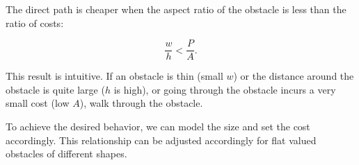 The direct path is cheaper when the aspect ratio of the obstacle  is less than the ratio of costs:

\begin{equation}
\frac{w}{h} < \frac{P}{A}.
\end{equation}

This result is intuitive. If an obstacle is thin (small $w$) or the distance around the obstacle is quite large ($h$ is high), or going through the obstacle incurs a very small cost (low $A$), walk through the obstacle. 

To achieve the desired behavior, we can model the size and set the cost accordingly. This relationship can be adjusted accordingly for flat valued obstacles of different shapes. 




